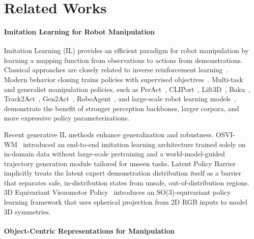 \section{Related Works}
\label{sec:related_works}

\paragraph{Imitation Learning for Robot Manipulation}
Imitation Learning (IL) provides an efficient paradigm for robot manipulation by learning a mapping function from observations to actions from demonstrations. Classical approaches are closely related to inverse reinforcement learning~\cite{Ng2000Algorithms,Abbeel2004Apprenticeship}. Modern behavior cloning trains policies with supervised objectives~\cite{Schaal1996Learning,Schaal2003Learning,Ross2010Reduction,ijcai2019Recent,Chen2023Sequential}. Multi-task and generalist manipulation policies, such as PerAct~\cite{shridhar2022peract}, CLIPort~\cite{Shridhar2022CLIPort}, Lift3D~\cite{Jia_2025_CVPR}, Baku~\cite{Haldar2025BAKU}, Track2Act~\cite{Bharadhwaj2024Track2Act}, Gen2Act~\cite{Bharadhwaj25a2025Gen2Act}, RoboAgent~\cite{Bharadhwaj2024RoboAgent}, and large-scale robot learning models~\cite{Neill2024Open}, demonstrate the benefit of stronger perception backbones, larger corpora, and more expressive policy parameterizations.

Recent generative IL methods enhance generalization and robustness.
OSVI-WM~\cite{goswami2026osviwm} introduced an end-to-end imitation learning architecture trained solely on in-domain data without large-scale pretraining and a world-model-guided trajectory generation module tailored for unseen tasks.
Latent Policy Barrier~\cite{sun2026latent} implicitly treats the latent expert demonstration distribution itself as a barrier that separates safe, in-distribution states from unsafe, out-of-distribution regions.
3D Equivariant Visuomotor Policy~\cite{hu2026d} introduces an SO(3)-equivariant policy learning framework that uses spherical projection from 2D RGB inputs to model 3D symmetries. 

\paragraph{Object-Centric Representations for Manipulation}

